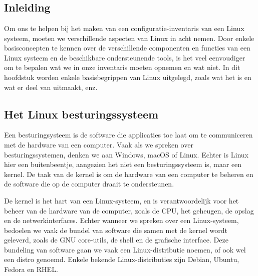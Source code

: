 
\chapter{}%
\label{ch:linux-server-concepten}

\section{Inleiding}
\label{linux_inleiding}

Om ons te helpen bij het maken van een configuratie-inventaris van een Linux systeem, moeten we verschillende aspecten van Linux in acht nemen.
Door enkele basisconcepten te kennen over de verschillende componenten en functies van een Linux systeem en de beschikbare ondersteunende tools, is het veel eenvoudiger om te bepalen wat we in onze inventaris moeten opnemen en wat niet.
In dit hoofdstuk worden enkele basisbegrippen van Linux uitgelegd, zoals wat het is en wat er deel van uitmaakt, enz.

\section{Het Linux besturingssysteem}
\label{linux_linux_besturingssysteem}

Een besturingsysteem is de software die applicaties toe laat om te communiceren met de hardware van een computer.
Vaak als we spreken over besturingssystemen, denken we aan Windows, macOS of Linux.
Echter is Linux hier een buitenbeentje, aangezien het niet een besturingssysteem is, maar een kernel.
De taak van de kernel is om de hardware van een computer te beheren en de software die op de computer draait te ondersteunen.

De kernel is het hart van een Linux-systeem, en is verantwoordelijk voor het beheer van de hardware van de computer, zoals de CPU, het geheugen, de opslag en de netwerkinterfaces.
Echter wanneer we spreken over een Linux-systeem, bedoelen we vaak de bundel van software die samen met de kernel wordt geleverd, zoals de GNU core-utils, de shell en de grafische interface.
Deze bundeling van software gaan we vaak een Linux-distributie noemen, of ook wel een distro genoemd.
Enkele bekende Linux-distributies zijn Debian, Ubuntu, Fedora en RHEL.

